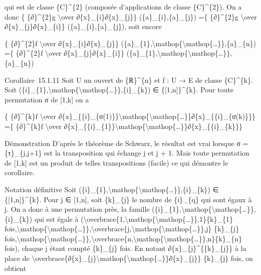 \documentclass[]{article}
\begin{document}
qui est de classe \{C\}\^{}\{2\} (composée d'applications de classe
\{C\}\^{}\{2\}). On a donc \{ \{∂\}\^{}\{2\}g \textbackslash{}over
∂\{x\}\_\{i\}∂\{x\}\_\{j\}\} (\{a\}\_\{i\},\{a\}\_\{j\}) =\{
\{∂\}\^{}\{2\}g \textbackslash{}over ∂\{x\}\_\{j\}∂\{x\}\_\{i\}\}
(\{a\}\_\{i\},\{a\}\_\{j\}), soit encore

\{ \{∂\}\^{}\{2\}f \textbackslash{}over ∂\{x\}\_\{i\}∂\{x\}\_\{j\}\}
(\{a\}\_\{1\},\textbackslash{}mathop\{\textbackslash{}mathop\{\ldots{}\}\},\{a\}\_\{n\})
=\{ \{∂\}\^{}\{2\}f \textbackslash{}over ∂\{x\}\_\{j\}∂\{x\}\_\{i\}\}
(\{a\}\_\{1\},\textbackslash{}mathop\{\textbackslash{}mathop\{\ldots{}\}\},\{a\}\_\{n\})

Corollaire~15.1.11 Soit U un ouvert de \{ℝ\}\^{}\{n\} et f : U → E de
classe \{C\}\^{}\{k\}. Soit
(\{i\}\_\{1\},\textbackslash{}mathop\{\textbackslash{}mathop\{\ldots{}\}\},\{i\}\_\{k\})
∈ \{{[}1,n{]}\}\^{}\{k\}. Pour toute permutation σ de {[}1,k{]} on a

\{ \{∂\}\^{}\{k\}f \textbackslash{}over
∂\{x\}\_\{\{i\}\_\{σ(1)\}\}\textbackslash{}mathop\{\textbackslash{}mathop\{\ldots{}\}\}∂\{x\}\_\{\{i\}\_\{σ(k)\}\}\}
=\{ \{∂\}\^{}\{k\}f \textbackslash{}over
∂\{x\}\_\{\{i\}\_\{1\}\}\textbackslash{}mathop\{\textbackslash{}mathop\{\ldots{}\}\}∂\{x\}\_\{\{i\}\_\{k\}\}\}

Démonstration D'après le théorème de Schwarz, le résultat est vrai
lorsque σ = \{τ\}\_\{j,j+1\} est la transposition qui échange j et j +
1. Mais toute permutation de {[}1,k{]} est un produit de telles
transpositions (facile) ce qui démontre le corollaire.

Notation définitive Soit
(\{i\}\_\{1\},\textbackslash{}mathop\{\textbackslash{}mathop\{\ldots{}\}\},\{i\}\_\{k\})
∈ \{{[}1,n{]}\}\^{}\{k\}. Pour j ∈ {[}1,n{]}, soit \{k\}\_\{j\} le
nombre de \{i\}\_\{q\} qui sont égaux à j. On a donc à une permutation
près, la famille
(\{i\}\_\{1\},\textbackslash{}mathop\{\textbackslash{}mathop\{\ldots{}\}\},\{i\}\_\{k\})
qui est égale à
(\textbackslash{}overbrace\{1,\textbackslash{}mathop\{\textbackslash{}mathop\{\ldots{}\}\},1\}\{k\}\_\{1\}
fois,\textbackslash{}mathop\{\textbackslash{}mathop\{\ldots{}\}\},\textbackslash{}overbrace\{j,\textbackslash{}mathop\{\textbackslash{}mathop\{\ldots{}\}\},j\}
\{k\}\_\{j\}
fois,\textbackslash{}mathop\{\textbackslash{}mathop\{\ldots{}\}\},\textbackslash{}overbrace\{n,\textbackslash{}mathop\{\textbackslash{}mathop\{\ldots{}\}\},n\}\{k\}\_\{n\}
fois), chaque j étant compté \{k\}\_\{j\} fois. En notant
∂\{x\}\_\{j\}\^{}\{\{k\}\_\{j\}\} à la place de
\textbackslash{}overbrace\{∂\{x\}\_\{j\}\textbackslash{}mathop\{\textbackslash{}mathop\{\ldots{}\}\}∂\{x\}\_\{j\}\}
\{k\}\_\{j\} fois, on obtient
\end{document}
